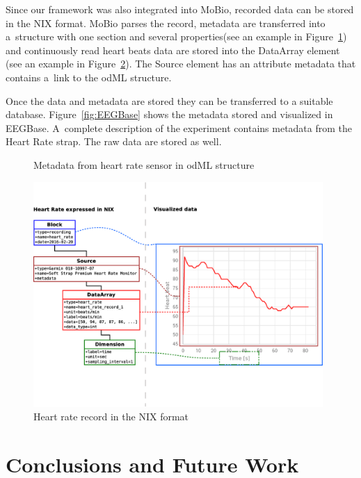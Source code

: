 \documentclass[conference]{IEEEtran}
\begin{document}
Since our framework was also integrated into MoBio, recorded data can be stored in the NIX format. MoBio parses the record, metadata are transferred into a~structure with one section and several properties(see an example in Figure~\ref{odML}) and continuously read heart beats data are stored into the DataArray element (see an example in Figure~\ref{NIX-ex}). The Source element has an attribute metadata that contains a~link to the odML structure.

Once the data and metadata are stored they can be transferred to a suitable database. Figure~\ref{fig:EEGBase} shows the metadata stored and visualized in EEGBase. A~complete description of the experiment contains metadata from the Heart Rate strap. The raw data are stored as well.

\begin{figure}

\caption{\label{odML}Metadata from heart rate sensor in odML structure}
\end{figure}

\begin{figure}
\centering\includegraphics[width=11cm]{NIX-example.eps}
\caption{\label{NIX-ex}Heart rate record in the NIX format}
\end{figure}



\section{Conclusions and Future Work}\label{sec:future-work}
\end{document}
